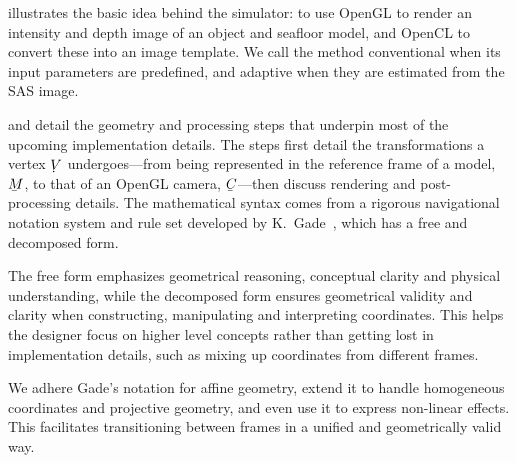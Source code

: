  illustrates the basic idea behind the simulator: to use OpenGL to render an intensity and depth image of an object and seafloor model, and OpenCL to convert these into an image template. We call the method conventional when its input parameters are predefined, and adaptive when they are estimated from the SAS image.



 and  detail the geometry and processing steps that underpin most of the upcoming implementation details. The steps first detail the transformations a vertex $\udot{V}$ undergoes---from being represented in the reference frame of a model, $\ubar{M}$, to that of an OpenGL camera, $\ubar{C}$---then discuss rendering and post-processing details. The mathematical syntax comes from a rigorous navigational notation system and rule set developed by K.~Gade~\cite{Gade2018}, which has a free and decomposed form.


The free form emphasizes geometrical reasoning, conceptual clarity and physical understanding, while the decomposed form ensures geometrical validity and clarity when constructing, manipulating and interpreting coordinates. This helps the designer focus on higher level concepts rather than getting lost in implementation details, such as mixing up coordinates from different frames.%
%

We adhere Gade's notation for affine geometry, extend it to handle homogeneous coordinates and projective geometry, and even use it to express non-linear effects. This facilitates transitioning between frames in a unified and geometrically valid way.




